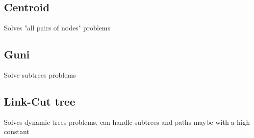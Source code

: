 \subsection{Centroid }

Solves "all pairs of nodes" problems \\

\subsection{Guni }

Solve subtrees problems\\

\subsection{Link-Cut tree }

Solves dynamic trees problems, can handle subtrees and paths maybe with a high constant\\
